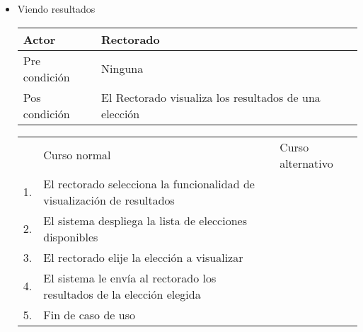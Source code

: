 \begin{itemize}
\bigskip
\item Viendo resultados
\begin{center}
\begin{tabular}{ll}
Actor & Rectorado \\
\hline
Pre condición & Ninguna\\
\hline
Pos condición & El Rectorado visualiza los resultados de una elección \\
\hline
\end{tabular}
\medskip
\begin{tabular}{c p{4cm}|p{4cm}}
 & Curso normal & Curso alternativo \\
 1. & El rectorado selecciona la funcionalidad de visualización de resultados &   \\
 2. & El sistema despliega la lista de elecciones disponibles &   \\
 3. & El rectorado elije la elección a visualizar & \\
 4. & El sistema le env\'ia al rectorado los resultados de la elección elegida\\
 5. & Fin de caso de uso & \\
\end{tabular}
\end{center}  

\end{itemize}